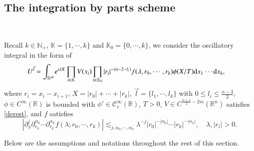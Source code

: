 \documentclass[11pt,reqno]{amsart}
\def\C {{\mathcal C}}
\def\d{{\rm d}}
\numberwithin{equation}{section}
\theoremstyle{definition}
\begin{document}
\subsection{The integration by parts scheme}\label{section5.2}\

Recall $k\in\mathbb{N}_+$, $\mathbb{K}=\{1,\cdots,k\}$ and $\mathbb{K}_0=\{0,\cdots,k\}$, we consider the oscillatory integral in the form of
\begin{equation*}\label{U^l}
	\begin{split}
		U^{\vec{l}}=\int_{\mathbb{R}^{nk}}&e^{\mathrm{i}\lambda X}\prod_{i\in\mathbb{K}}V(x_i)\prod_{i\in\mathbb{K}_0}|r_i|^{-(n-2-l_i)}f(\lambda,r_0,\cdots,r_k)\phi(X/T)\d x_1\cdots \d x_k,
	\end{split}
\end{equation*}
where $r_i=x_i-x_{i+1}$, $X=|r_0|+\cdots+|r_k|$, $\vec{l}=\{l_1,\cdots,l_k\}$ with $0\leq l_i\leq\frac{n-3}{2}$, $\phi\in C^\infty(\mathbb{R})$ is bounded with $\phi'\in\C_c^\infty(\mathbb{R})$, $T>0$, $V\in C^{\frac{n+1}{2}-2m}(\mathbb{R}^n)$ satisfies \eqref{derest}, and $f$ satisfies 
\begin{equation*}
	\left|\partial_\lambda^j\partial_{r_0}^{\alpha_0}\cdots\partial_{r_k}^{\alpha_k}f(\lambda;r_0,\cdots,r_k)\right|\lesssim_{j,\alpha_0,\cdots,\alpha_k}\lambda^{-j}|r_0|^{-|\alpha_0|}\cdots|r_k|^{-|\alpha_k|},\quad\lambda,|r_i|>0.
\end{equation*}

Below are the assumptions and notations throughout the rest of this section.
\end{document}
